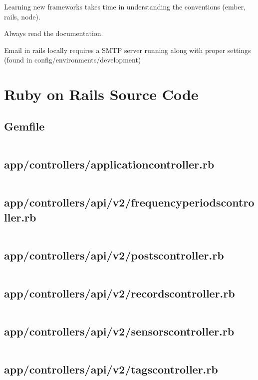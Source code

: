 \documentclass[letterpaper, 12 pt]{article}
\begin{document}
Learning new frameworks takes time in understanding the conventions (ember, rails, node).


Always read the documentation.


Email in rails locally requires a SMTP server running along with proper settings (found in config/environments/development)

\section{Ruby on Rails Source Code}
\subsection{Gemfile}
\inputminted{ruby}{../Gemfile}

\subsection{app/controllers/application\textunderscore controller.rb}
\inputminted{ruby}{../app/controllers/application_controller.rb}
\subsection{app/controllers/api/v2/frequency\textunderscore periods\textunderscore controller.rb}
\inputminted{ruby}{../app/controllers/api/v2/frequency_periods_controller.rb}
\subsection{app/controllers/api/v2/posts\textunderscore controller.rb}
\inputminted{ruby}{../app/controllers/api/v2/posts_controller.rb}
\subsection{app/controllers/api/v2/records\textunderscore controller.rb}
\inputminted{ruby}{../app/controllers/api/v2/records_controller.rb}
\subsection{app/controllers/api/v2/sensors\textunderscore controller.rb}
\inputminted{ruby}{../app/controllers/api/v2/sensors_controller.rb}
\subsection{app/controllers/api/v2/tags\textunderscore controller.rb}
\inputminted{ruby}{../app/controllers/api/v2/tags_controller.rb}
\end{document}

